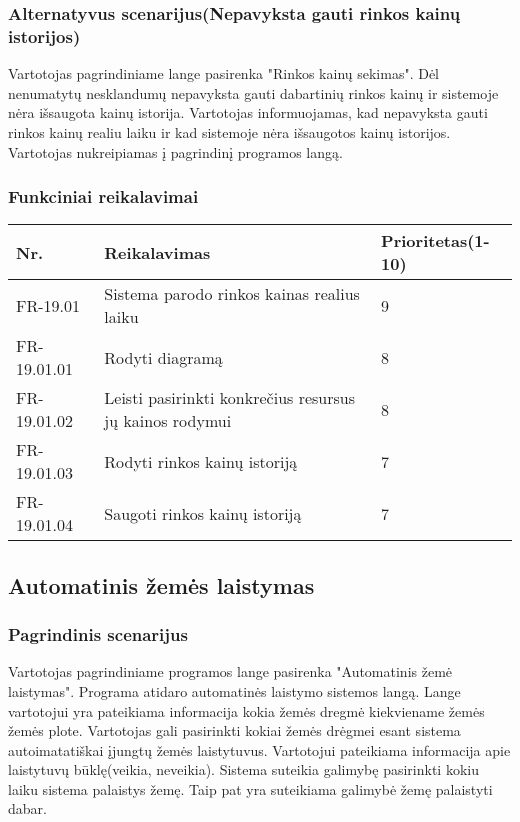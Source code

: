 \documentclass[oneside]{VUMIFPSkursinis}
\begin{document}
	\subsubsection{Alternatyvus scenarijus(Nepavyksta gauti rinkos kainų istorijos)}
	Vartotojas pagrindiniame lange pasirenka "Rinkos kainų sekimas". Dėl nenumatytų nesklandumų nepavyksta gauti dabartinių rinkos kainų ir sistemoje nėra išsaugota kainų istorija. Vartotojas informuojamas, kad nepavyksta gauti rinkos kainų realiu laiku ir kad sistemoje nėra išsaugotos kainų istorijos. Vartotojas nukreipiamas  į pagrindinį programos langą.
	\subsubsection{Funkciniai reikalavimai}
\begin{table}[htbp]
	\begin{tabularx}{1\textwidth}{ |P{2.5cm}|X|P{3cm }| } \hline
		Nr. & Reikalavimas & Prioritetas(1-10) \\ \hline
		FR-19.01 & Sistema parodo rinkos kainas realius laiku &  9 \\ \hline
		FR-19.01.01 & Rodyti diagramą & 8 \\ \hline
		FR-19.01.02 & Leisti pasirinkti konkrečius resursus jų kainos rodymui & 8 \\ \hline
		FR-19.01.03 & Rodyti rinkos kainų istoriją & 7 \\ \hline
		FR-19.01.04 & Saugoti rinkos kainų istoriją & 7 \\ \hline
		
	\end{tabularx}
\end{table}
	 
\subsection{Automatinis žemės laistymas}
	\subsubsection{Pagrindinis scenarijus}
	Vartotojas pagrindiniame programos lange pasirenka "Automatinis žemė laistymas". Programa atidaro automatinės laistymo sistemos langą. Lange vartotojui yra pateikiama informacija kokia žemės dregmė kiekviename žemės žemės plote. Vartotojas gali pasirinkti kokiai žemės drėgmei esant sistema autoimatatiškai įjungtų žemės laistytuvus. Vartotojui pateikiama informacija apie laistytuvų būklę(veikia, neveikia). Sistema suteikia galimybę pasirinkti kokiu laiku sistema palaistys žemę. Taip pat yra suteikiama galimybė žemę palaistyti dabar.
\end{document}
